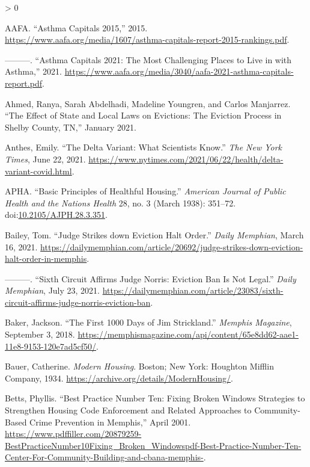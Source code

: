 \documentclass[
  openany]{book}
\newlength{\cslhangindent}
\newenvironment{CSLReferences}[2] %
 {%
  \setlength{\parindent}{0pt}
  \ifodd #1 \everypar{\setlength{\hangindent}{\cslhangindent}}\ignorespaces\fi
  \ifnum #2 > 0
  \setlength{\parskip}{#2\baselineskip}
  \fi
 }%
 {}
\begin{document}
\hypertarget{refs}{}
\begin{CSLReferences}{1}{0}
\leavevmode\hypertarget{ref-aafa2015}{}%
AAFA. {``Asthma Capitals 2015,''} 2015. \url{https://www.aafa.org/media/1607/asthma-capitals-report-2015-rankings.pdf}.

\leavevmode\hypertarget{ref-aafa2021}{}%
---------. {``Asthma Capitals 2021: The Most Challenging Places to Live in with Asthma,''} 2021. \url{https://www.aafa.org/media/3040/aafa-2021-asthma-capitals-report.pdf}.

\leavevmode\hypertarget{ref-ahmed2021}{}%
Ahmed, Ranya, Sarah Abdelhadi, Madeline Youngren, and Carlos Manjarrez. {``The Effect of State and Local Laws on Evictions: The Eviction Process in Shelby County, TN,''} January 2021.

\leavevmode\hypertarget{ref-anthes2021}{}%
Anthes, Emily. {``The Delta Variant: What Scientists Know.''} \emph{The New York Times}, June 22, 2021. \url{https://www.nytimes.com/2021/06/22/health/delta-variant-covid.html}.

\leavevmode\hypertarget{ref-apha1938}{}%
APHA. {``Basic Principles of Healthful Housing.''} \emph{American Journal of Public Health and the Nations Health} 28, no. 3 (March 1938): 351--72. doi:\href{https://doi.org/10.2105/AJPH.28.3.351}{10.2105/AJPH.28.3.351}.

\leavevmode\hypertarget{ref-bailey2021}{}%
Bailey, Tom. {``Judge Strikes down Eviction Halt Order.''} \emph{Daily Memphian}, March 16, 2021. \url{https://dailymemphian.com/article/20692/judge-strikes-down-eviction-halt-order-in-memphis}.

\leavevmode\hypertarget{ref-bailey2021a}{}%
---------. {``Sixth Circuit Affirms Judge Norris: Eviction Ban Is Not Legal.''} \emph{Daily Memphian}, July 23, 2021. \url{https://dailymemphian.com/article/23083/sixth-circuit-affirms-judge-norris-eviction-ban}.

\leavevmode\hypertarget{ref-baker2018}{}%
Baker, Jackson. {``The First 1000 Days of Jim Strickland.''} \emph{Memphis Magazine}, September 3, 2018. \url{https://memphismagazine.com/api/content/65e8dd62-aae1-11e8-9153-120e7ad5cf50/}.

\leavevmode\hypertarget{ref-bauer1934}{}%
Bauer, Catherine. \emph{Modern Housing}. Boston; New York: Houghton Mifflin Company, 1934. \url{https://archive.org/details/ModernHousing/}.

\leavevmode\hypertarget{ref-betts2001}{}%
Betts, Phyllis. {``Best Practice Number Ten: Fixing Broken Windows {{}} Strategies to Strengthen Housing Code Enforcement and Related Approaches to Community-Based Crime Prevention in Memphis,''} April 2001. \url{https://www.pdffiller.com/20879259-BestPracticeNumber10Fixing_Broken_Windowspdf-Best-Practice-Number-Ten-Center-For-Community-Building-and-cbana-memphis-}.


\end{CSLReferences}
\end{document}
